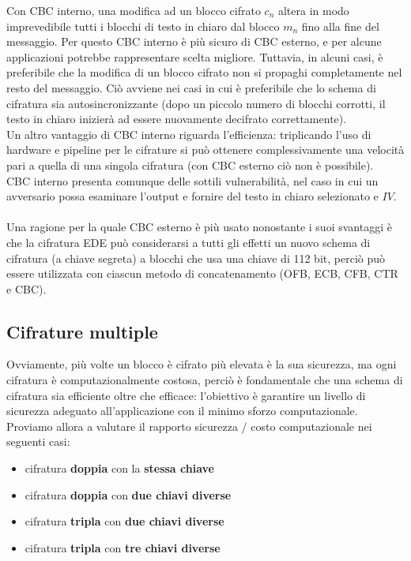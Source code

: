 \newline \newline
Con CBC interno, una modifica ad un blocco cifrato $c_{n}$ altera in modo imprevedibile tutti i blocchi di testo in chiaro dal blocco $m_{n}$ fino alla fine del messaggio. Per questo CBC interno è più sicuro di CBC esterno, e per alcune applicazioni potrebbe rappresentare scelta migliore. Tuttavia, in alcuni casi, è preferibile che la modifica di un blocco cifrato non si propaghi completamente nel resto del messaggio. Ciò avviene nei casi in cui è preferibile che lo schema di cifratura sia autosincronizzante (dopo un piccolo numero di blocchi corrotti, il testo in chiaro inizierà ad essere nuovamente decifrato correttamente). \\
Un altro vantaggio di CBC interno riguarda l'efficienza: triplicando l'uso di hardware e pipeline per le cifrature si può ottenere complessivamente una velocità pari a quella di una singola cifratura (con CBC esterno ciò non è possibile).\\
CBC interno presenta comunque delle sottili vulnerabilità, nel caso in cui un avversario possa esaminare l'output e fornire del testo in chiaro selezionato e $IV$.\\ \\
Una ragione per la quale CBC esterno è più usato nonostante i suoi svantaggi è che la cifratura EDE può considerarsi a tutti gli effetti un nuovo schema di cifratura (a chiave segreta) a blocchi che usa una chiave di 112 bit, perciò può essere utilizzata con ciascun metodo di concatenamento (OFB, ECB, CFB, CTR e CBC).

\subsection{Cifrature multiple}
Ovviamente, più volte un blocco è cifrato più elevata è la sua sicurezza, ma ogni cifratura è computazionalmente costosa, perciò è fondamentale che una schema di cifratura sia efficiente oltre che efficace: l'obiettivo è garantire un livello di sicurezza adeguato all'applicazione con il minimo sforzo computazionale. \\
Proviamo allora a valutare il rapporto sicurezza / costo computazionale nei seguenti casi:
\begin{itemize}
\item cifratura \textbf{doppia} con la \textbf{stessa chiave}
\item cifratura \textbf{doppia} con \textbf{due chiavi diverse}
\item cifratura \textbf{tripla} con \textbf{due chiavi diverse}
\item cifratura \textbf{tripla} con \textbf{tre chiavi diverse}
\end{itemize}

